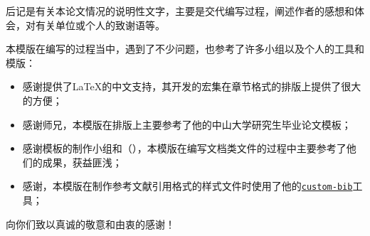 \begin{acknowledgements}
    后记是有关本论文情况的说明性文字，主要是交代编写过程，阐述作者的感想和体会，对有关单位或个人的致谢语等。

    本模版在编写的过程当中，遇到了不少问题，也参考了许多小组以及个人的工具和模版：
    \begin{itemize}
        \item 感谢\href{https://github.com/CTeX-org/ctex-kit}{}提供了\LaTeX{}的中文支持，其开发的\href{https://ctan.org/tex-archive/language/chinese/ctex}{}宏集在章节格式的排版上提供了很大的方便；
        \item 感谢\href{https://www.zhihu.com/people/sgcd-33}{}师兄，本模版在排版上主要参考了他的中山大学研究生毕业论文模板\href{https://www.overleaf.com/latex/templates/zhong-shan-da-xue-yan-jiu-sheng-bi-ye-lun-wen-mo-ban-sysupalte/kybsnywqbcdc}{}；
        \item 感谢\href{https://github.com/sjtug/SJTUThesis}{}模板的制作小组和\href{https://github.com/nanmu42}{}（\href{https://github.com/nanmu42/CQUThesis}{}），本模版在编写文档类文件的过程中主要参考了他们的成果，获益匪浅；
        \item 感谢\href{https://www.ctan.org/author/daly}{}，本模版在制作参考文献引用格式的样式文件时使用了他的\href{https://www.ctan.org/tex-archive/macros/latex/contrib/custom-bib/}{\texttt{custom-bib}}工具；
    \end{itemize}
    向你们致以真诚的敬意和由衷的感谢！
\end{acknowledgements}
